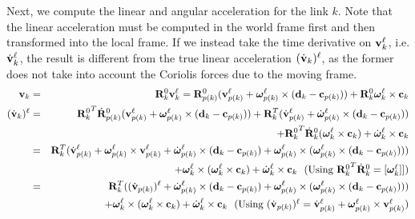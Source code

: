 Next, we compute the linear and angular acceleration for the link
$k$. Note that the linear acceleration must be computed in the world
frame first and then transformed into the local frame. If we instead
take the time derivative on $\mathbf{v}_k^\ell$,
i.e. $\dot{\mathbf{v}}_k^\ell$, the result is different from the true
linear acceleration $(\dot{\mathbf{v}}_k)^\ell$, as the former does not
take into account the Coriolis forces due to the moving frame.
\begin{eqnarray}
\mathbf{v}_k &=& \mathbf{R}^0_k \mathbf{v}_k^\ell = \mathbf{R}^0_{p(k)} (\mathbf{v}_{p(k)}^\ell + \bm{\omega}_{p(k)}^\ell \times
(\mathbf{d}_k -\mathbf{c}_{p(k)})) + \mathbf{R}^0_k \bm{\omega}_k^\ell \times
\mathbf{c}_k \nonumber \\
(\dot{\mathbf{v}}_k)^\ell &=& {\mathbf{R}^0_k}^T \dot{\mathbf{R}}^0_{p(k)}
(\mathbf{v}_{p(k)}^\ell + \bm{\omega}_{p(k)}^\ell \times (\mathbf{d}_k -
\mathbf{c}_{p(k)})) + \mathbf{R}_k^T (\dot{\mathbf{v}}_{p(k)}^\ell +
  \dot{\bm{\omega}}_{p(k)}^\ell \times (\mathbf{d}_k - \mathbf{c}_{p(k)}))
  \nonumber \\ &&+
  {\mathbf{R}^0_k}^T \dot{\mathbf{R}}^0_k (\bm{\omega}_k^\ell \times \mathbf{c}_k)
  + \dot{\bm{\omega}}_k^\ell \times \mathbf{c}_k \nonumber \\
&=& \mathbf{R}_k^T (\dot{\mathbf{v}}_{p(k)}^\ell +
\bm{\omega}_{p(k)}^\ell \times \mathbf{v}_{p(k)}^\ell + \dot{\bm{\omega}}_{p(k)}^\ell \times (\mathbf{d}_k - \mathbf{c}_{p(k)}) + \bm{\omega}_{p(k)}^\ell \times (\bm{\omega}_{p(k)}^\ell \times (\mathbf{d}_k -
\mathbf{c}_{p(k)}))) \nonumber \\ && + \bm{\omega}_k^\ell \times (\bm{\omega}_k^\ell
\times \mathbf{c}_k) + \dot{\bm{\omega}}_k^\ell \times \mathbf{c}_k \mbox{\ \
  (Using ${\mathbf{R}^0_k}^T \dot{\mathbf{R}}^0_k = [\bm{\omega}_k^\ell]]$)} \nonumber \\
&=& \mathbf{R}_k^T ((\dot{\mathbf{v}}_{p(k)})^\ell + \dot{\bm{\omega}}_{p(k)}^\ell \times (\mathbf{d}_k - \mathbf{c}_{p(k)}) + \bm{\omega}_{p(k)}^\ell \times (\bm{\omega}_{p(k)}^\ell \times (\mathbf{d}_k -
\mathbf{c}_{p(k)}))) \nonumber \\ && + \bm{\omega}_k^\ell \times (\bm{\omega}_k^\ell
\times \mathbf{c}_k) + \dot{\bm{\omega}}_k^\ell \times \mathbf{c}_k \mbox{\ \
  (Using ($\dot{\mathbf{v}}_{p(k)})^\ell = \dot{\mathbf{v}}_{p(k)}^\ell +
\bm{\omega}_{p(k)}^\ell \times \mathbf{v}_{p(k)}^\ell$)} 
\end{eqnarray}


